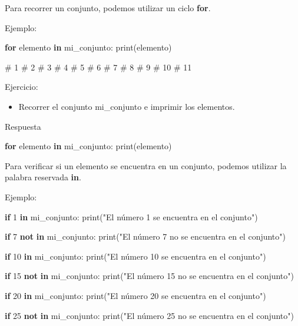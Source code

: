 \documentclass[
  a4paper,
  DIV=11,
  numbers=noendperiod,
  onepage,
  openany]{scrreprt}
\newenvironment{Shaded}{\begin{snugshade}}{\end{snugshade}}
\newcommand{\BuiltInTok}[1]{\textcolor[rgb]{0.00,0.23,0.31}{#1}}
\newcommand{\CommentTok}[1]{\textcolor[rgb]{0.37,0.37,0.37}{#1}}
\newcommand{\ControlFlowTok}[1]{\textcolor[rgb]{0.00,0.23,0.31}{\textbf{#1}}}
\newcommand{\DecValTok}[1]{\textcolor[rgb]{0.68,0.00,0.00}{#1}}
\newcommand{\KeywordTok}[1]{\textcolor[rgb]{0.00,0.23,0.31}{\textbf{#1}}}
\newcommand{\NormalTok}[1]{\textcolor[rgb]{0.00,0.23,0.31}{#1}}
\newcommand{\StringTok}[1]{\textcolor[rgb]{0.13,0.47,0.30}{#1}}
\providecommand{\tightlist}{%
  \setlength{\itemsep}{0pt}\setlength{\parskip}{0pt}}\usepackage{longtable,booktabs,array}
\begin{document}
Para recorrer un conjunto, podemos utilizar un ciclo \textbf{for}.

Ejemplo:

\begin{Shaded}
\begin{Highlighting}[]
\ControlFlowTok{for}\NormalTok{ elemento }\KeywordTok{in}\NormalTok{ mi\_conjunto:}
    \BuiltInTok{print}\NormalTok{(elemento)}

\CommentTok{\# 1}
\CommentTok{\# 2}
\CommentTok{\# 3}
\CommentTok{\# 4}
\CommentTok{\# 5}
\CommentTok{\# 6}
\CommentTok{\# 7}
\CommentTok{\# 8}
\CommentTok{\# 9}
\CommentTok{\# 10}
\CommentTok{\# 11}
\end{Highlighting}
\end{Shaded}

Ejercicio:

\begin{itemize}
\tightlist
\item
  Recorrer el conjunto mi\_conjunto e imprimir los elementos.
\end{itemize}

Respuesta

\begin{Shaded}
\begin{Highlighting}[]
\ControlFlowTok{for}\NormalTok{ elemento }\KeywordTok{in}\NormalTok{ mi\_conjunto:}
    \BuiltInTok{print}\NormalTok{(elemento)}
\end{Highlighting}
\end{Shaded}

Para verificar si un elemento se encuentra en un conjunto, podemos
utilizar la palabra reservada \textbf{in}.

Ejemplo:

\begin{Shaded}
\begin{Highlighting}[]
\ControlFlowTok{if} \DecValTok{1} \KeywordTok{in}\NormalTok{ mi\_conjunto:}
    \BuiltInTok{print}\NormalTok{(}\StringTok{"El número 1 se encuentra en el conjunto"}\NormalTok{)}

\ControlFlowTok{if} \DecValTok{7} \KeywordTok{not} \KeywordTok{in}\NormalTok{ mi\_conjunto:}
    \BuiltInTok{print}\NormalTok{(}\StringTok{"El número 7 no se encuentra en el conjunto"}\NormalTok{)}

\ControlFlowTok{if} \DecValTok{10} \KeywordTok{in}\NormalTok{ mi\_conjunto:}
    \BuiltInTok{print}\NormalTok{(}\StringTok{"El número 10 se encuentra en el conjunto"}\NormalTok{)}

\ControlFlowTok{if} \DecValTok{15} \KeywordTok{not} \KeywordTok{in}\NormalTok{ mi\_conjunto:}
    \BuiltInTok{print}\NormalTok{(}\StringTok{"El número 15 no se encuentra en el conjunto"}\NormalTok{)}

\ControlFlowTok{if} \DecValTok{20} \KeywordTok{in}\NormalTok{ mi\_conjunto:}
    \BuiltInTok{print}\NormalTok{(}\StringTok{"El número 20 se encuentra en el conjunto"}\NormalTok{)}

\ControlFlowTok{if} \DecValTok{25} \KeywordTok{not} \KeywordTok{in}\NormalTok{ mi\_conjunto:}
    \BuiltInTok{print}\NormalTok{(}\StringTok{"El número 25 no se encuentra en el conjunto"}\NormalTok{)}
\end{Highlighting}
\end{Shaded}
\end{document}
